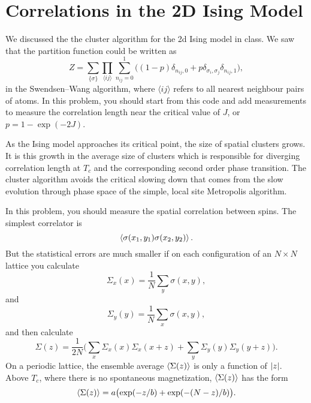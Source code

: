 \section{Correlations in the 2D Ising Model}

We discussed the the cluster algorithm for the 2d Ising model in class. We saw that the
partition function could be written as
%
\begin{equation}
    Z = \sum_{\{\sigma\}} \prod_{\langle i j \rangle} \sum_{n_{ij}=0}^1
    \bigl((1 - p) \delta_{n_{ij},0} + p \delta_{\sigma_i,\sigma_j} \delta_{n_{ij},1}\bigr),
\end{equation}
%
in the Swendsen--Wang algorithm,
where \(\langle i j \rangle\) refers to all nearest neighbour pairs of atoms.
In this problem, you should start from this code and add measurements to measure the
correlation length near the critical value of \(J\), or \(p=1 - \exp(-2J)\).

As the Ising model approaches its critical point, the size of spatial clusters grows. It is
this growth in the average size of clusters which is responsible for diverging correlation
length at \(T_c\) and the corresponding second order phase transition. The cluster algorithm
avoids the critical slowing down that comes from the slow evolution through phase space of
the simple, local site Metropolis algorithm.

In this problem, you should measure the spatial correlation between spins. The simplest
correlator is
%
\begin{equation}
    \expval{ \sigma(x_1, y_1) \sigma(x_2, y_2) }.
\end{equation}
%
But the statistical errors are much smaller if on each configuration of an \(N \times N\)
lattice you calculate
%
\begin{equation}
    \Sigma_x(x) = \frac{ 1 }{ N } \sum_y \sigma(x, y),
\end{equation}
%
and
%
\begin{equation}
    \Sigma_y(y) = \frac{ 1 }{ N } \sum_x \sigma(x, y),
\end{equation}
%
and then calculate
%
\begin{equation}\label{eq:Sigmaz}
    \Sigma(z) = \frac{ 1 }{ 2N } \biggl( \sum_x \Sigma_x(x) \Sigma_x(x+z)
    + \sum_y \Sigma_y(y) \Sigma_y(y+z) \biggr).
\end{equation}
%
On a periodic lattice, the ensemble average \(\expval{\Sigma(z)}\) is only a
function of \(\abs{z}\). Above \(T_c\),
where there is no spontaneous magnetization, \(\expval{\Sigma(z)}\) has the form
%
\begin{equation}\label{eq:Sigmazbar}
    \expval{\Sigma(z)} = a \bigl(\exp(-z / b) + \exp(-(N - z) / b)\bigr).
\end{equation}

